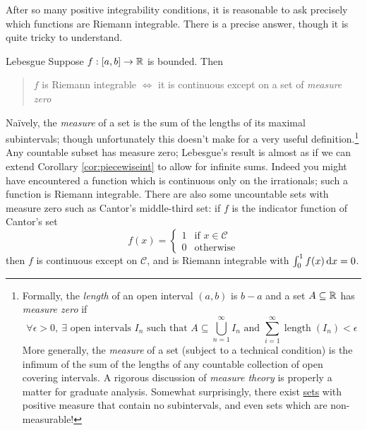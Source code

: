 After so many positive integrability conditions, it is reasonable to ask precisely which functions are Riemann integrable. There is a precise answer, though it is quite tricky to understand.

\begin{thm}{Lebesgue}{}
Suppose $f:[a,b]\to\mathbb{R}$ is bounded. Then
\begin{quote}
$f$ is Riemann integrable $\iff$ it is continuous except on a set of \emph{measure zero}
\end{quote}
\end{thm}

Naïvely, the \emph{measure} of a set is the sum of the lengths of its maximal subintervals; though unfortunately this doesn't make for a very useful definition.\footnote{Formally, the \emph{length} of an open interval $(a,b)$ is $b-a$ and a set $A\subseteq \mathbb{R}$ has \emph{measure zero} if
\[\forall\epsilon>0,\ \exists \text{ open intervals $I_n$ such that }A\subseteq\bigcup_{n=1}^\infty I_n\text{ and }\sum_{i=1}^\infty\operatorname{length}(I_n)<\epsilon\]
More generally, the \emph{measure} of a set (subject to a technical condition) is the infimum of the sum of the lengths of any countable collection of open covering intervals. A rigorous discussion of \emph{measure theory} is properly a matter for graduate analysis. %
Somewhat surprisingly, there exist \href{https://en.wikipedia.org/wiki/Smith-Volterra-Cantor_set}{sets} with positive measure that contain no subintervals, and even sets which are non-measurable!} Any countable subset has measure zero; Lebesgue's result is almost as if we can extend Corollary \ref{cor:piecewiseint} to allow for infinite sums. Indeed you might have encountered a function which is continuous only on the irrationals; such a function is Riemann integrable. There are also some uncountable sets with measure zero such as Cantor's middle-third set: if $f$ is the indicator function of Cantor's set
\[f(x)=\begin{cases}
1&\text{if }x\in\mathcal C\\
0&\text{otherwise}
\end{cases}\]
then $f$ is continuous except on $\mathcal C$, and is Riemann integrable with $\int_0^1 f(x)\,{\mathrm{d} x}=0$.


